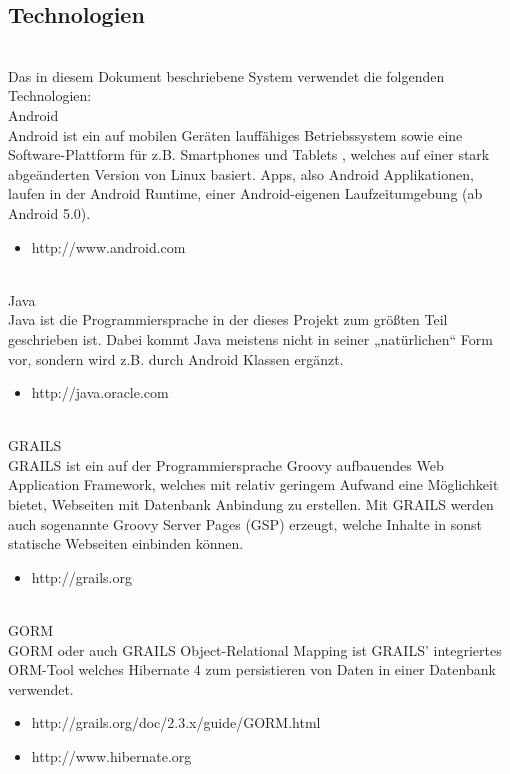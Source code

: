 \subsection{Technologien}\\
Das in diesem Dokument beschriebene System verwendet die folgenden Technologien:\\
Android\\
Android ist ein auf mobilen Ger\"aten lauff\"ahiges Betriebssystem sowie eine Software-Plattform f\"ur z.B. Smartphones und Tablets , welches auf einer stark abgeänderten Version von Linux basiert. Apps, also Android Applikationen, laufen in der Android Runtime, einer Android-eigenen Laufzeitumgebung (ab Android 5.0).\\
\begin{itemize}\\
\item http://www.android.com\\
\end{itemize}\\
Java\\
Java ist die Programmiersprache in der dieses Projekt zum größten Teil geschrieben ist. Dabei kommt Java meistens nicht in seiner „natürlichen“ Form vor, sondern wird z.B. durch Android Klassen ergänzt.\\
\begin{itemize}
\item http://java.oracle.com\\
\end{itemize}\\
GRAILS\\
GRAILS ist ein auf der Programmiersprache Groovy aufbauendes Web Application Framework, welches mit relativ geringem Aufwand eine Möglichkeit bietet, Webseiten mit Datenbank Anbindung zu erstellen. Mit GRAILS werden auch sogenannte Groovy Server Pages (GSP) erzeugt, welche Inhalte in sonst statische Webseiten einbinden können.\\
\begin{itemize}
\item http://grails.org\\
\end{itemize}\\
GORM\\
GORM oder auch GRAILS Object-Relational Mapping ist GRAILS' integriertes ORM-Tool welches Hibernate 4 zum persistieren von Daten in einer Datenbank verwendet.\\
\begin{itemize}
\item http://grails.org/doc/2.3.x/guide/GORM.html\\
\item http://www.hibernate.org\\
\end{itemize}\\
